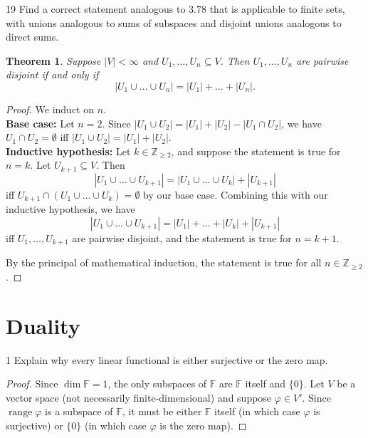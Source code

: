 \documentclass{extarticle}
\newenvironment{problem}[1]{\begin{prob*}{#1}{}}{\end{prob*}}
\newtheorem*{thm-non}{Theorem}
\newcommand{\Z}{\mathbb{Z}}
\newcommand{\F}{\mathbb{F}}
\DeclareMathOperator{\Range}{range}
\begin{document}
\begin{problem}{19}
Find a correct statement analogous to $3.78$ that is applicable to finite sets, with unions analogous to sums of subspaces and disjoint unions analogous to direct sums.
\end{problem}
\begin{thm-non}
Suppose $|V|<\infty$ and $U_1,\dots,U_n\subseteq V$.  Then $U_1,\dots,U_n$ are pairwise disjoint if and only if 
\begin{equation*}
|U_1 \cup \dots \cup U_n| = |U_1| + \dots + |U_n|.
\end{equation*}
\end{thm-non}
\begin{proof}
We induct on $n$.\\
\textbf{Base case:} Let $n = 2$.  Since $|U_1 \cup U_2| = |U_1| + |U_2| - |U_1\cap U_2|$, we have  $U_1\cap U_2=\emptyset$ iff $|U_1\cup U_2| = |U_1| + |U_2|$.\\
\textbf{Inductive hypothesis:} Let $k\in\Z_{\geq 2}$, and suppose the statement is true for $n = k$.  Let $U_{k+1}\subseteq V$.  Then
\begin{equation*}
|U_1\cup\dots\cup U_{k + 1}| = |U_1\cup\dots\cup U_k| + |U_{k+1}|
\end{equation*}
iff $U_{k+1}\cap (U_1\cup\dots\cup U_k)=\emptyset$ by our base case.  Combining this with our inductive hypothesis, we have
\begin{equation*}
|U_1\cup\dots\cup U_{k + 1}| = |U_1| + \dots + |U_k| + |U_{k+1}|
\end{equation*}
iff $U_1,\dots,U_{k+1}$ are pairwise disjoint, and the statement is true for $n = k+1$.
\par By the principal of mathematical induction, the statement is true for all $n\in\Z_{\geq 2}$.
\end{proof}


\section{Duality}

\begin{problem}{1}
Explain why every linear functional is either surjective or the zero map.
\end{problem}
\begin{proof}
Since $\dim\F=1$, the only subspaces of $\F$ are $\F$ itself and $\{0\}$.  Let $V$ be a vector space (not necessarily finite-dimensional) and suppose $\varphi\in V'$.  Since $\Range\varphi$ is a subspace of $\F$, it must be either $\F$ itself (in which case $\varphi$ is surjective) or $\{0\}$ (in which case $\varphi$ is the zero map).  
\end{proof}
\end{document}
